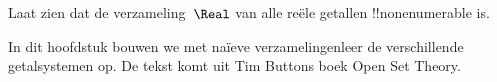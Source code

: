 \documentclass[openany]{memoir}
\begin{document}
\begin{prob}
Laat zien dat de verzameling~$\Real$ van alle reële getallen
!!{nonenumerable} is.
\end{prob}
\endgroup
\OLEndChapterHook

\begingroup
\def\olfilename{OLP-0041}
\def\olfilepath{content/sets-functions-relations/arithmetization/}
\hypertarget{unit-OLP-0041}{}


	

\begin{editorial}
In dit hoofdstuk bouwen we met na\"ieve verzamelingenleer de
verschillende getalsystemen op. De tekst komt uit Tim Buttons boek
Open Set Theory.
\end{editorial}
\endgroup

\begingroup
\def\olfilename{OLP-0042}
\def\olfilepath{content/sets-functions-relations/arithmetization/}
\hypertarget{unit-OLP-0042}{}
\end{document}
